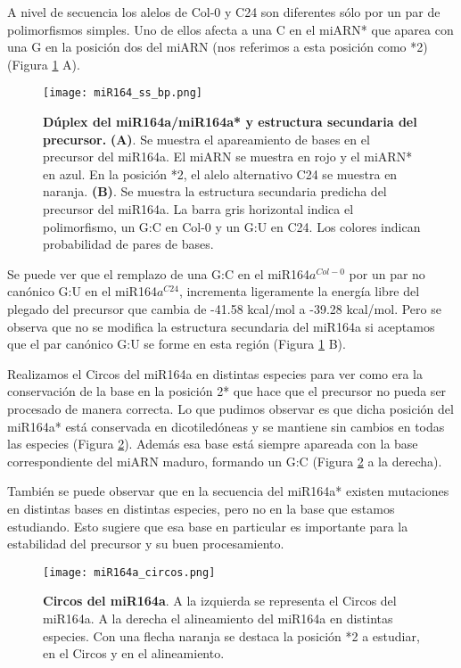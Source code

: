 A nivel de secuencia los alelos de Col-0 y C24 son diferentes sólo por un par de polimorfismos simples.
Uno de ellos afecta a una C en el miARN* que aparea con una G en la posición dos del miARN (nos referimos a esta posición como *2) (Figura \ref{fig:miR164_ss_bp} A).

\begin{figure}[htbp!] 
	\centering    
	\texttt{[image: miR164\_ss\_bp.png]}
	\caption[Dúplex del miR164a/miR164a* y estructura secundaria del precursor]{
		\textbf{Dúplex del miR164a/miR164a* y estructura secundaria del precursor.}
		\textbf{(A)}. Se muestra el apareamiento de bases en el precursor del miR164a.
		El miARN se muestra en rojo y el miARN* en azul.
		En la posición *2, el alelo alternativo C24 se muestra en naranja.
		\textbf{(B)}. Se muestra la estructura secundaria predicha del precursor del miR164a.
		La barra gris horizontal indica el polimorfismo, un G:C en Col-0 y un G:U en C24.
		Los colores indican probabilidad de pares de bases.
	}
	\label{fig:miR164_ss_bp}
\end{figure}

Se puede ver que el remplazo de una G:C en el miR164$a^{Col-0}$ por un par no canónico G:U en el miR164$a^{C24}$, incrementa ligeramente la energía libre del plegado del precursor que cambia de -41.58 kcal/mol a -39.28 kcal/mol.
Pero se observa que no se modifica la estructura secundaria del miR164a si aceptamos que el par canónico G:U se forme en esta región (Figura \ref{fig:miR164_ss_bp} B). 

Realizamos el Circos del miR164a en distintas especies para ver como era la conservación de la base en la posición 2* que hace que el precursor no pueda ser procesado de manera correcta.
Lo que pudimos observar es que dicha posición del miR164a* está conservada en dicotiledóneas y se mantiene sin cambios en todas las especies (Figura \ref{fig:miR164a_circos}).
Además esa base está siempre apareada con la base correspondiente del miARN maduro, formando un G:C (Figura \ref{fig:miR164a_circos} a la derecha).

También se puede observar que en la secuencia del miR164a* existen mutaciones en distintas bases en distintas especies, pero no en la base que estamos estudiando.
Esto sugiere que esa base en particular es importante para la estabilidad del precursor y su buen procesamiento.

    \begin{figure}[htbp!] 
        \centering    
        \texttt{[image: miR164a\_circos.png]}
        \caption[Circos del miR164a]{
			\textbf{Circos del miR164a}.
			A la izquierda se representa el Circos del miR164a.
			A la derecha el alineamiento del miR164a en distintas especies. 
			Con una flecha naranja se destaca la posición *2 a estudiar, en el Circos y en el alineamiento.
        }
        \label{fig:miR164a_circos}
    \end{figure}

